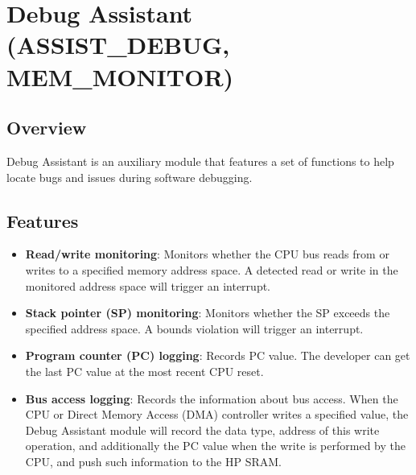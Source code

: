 \documentclass[main\_\_EN.tex]{subfiles}
\begin{document}

\ifglobal
\else
    {\let\clearpage\relax \listoftodos}
    {\let\clearpage\relax \listofdonetodos}
    \tableofcontents
\fi



\chapter{Debug Assistant (ASSIST\_DEBUG, MEM\_MONITOR)}
\label{mod:dbgassist}
\hypertarget{dbgassist}{}

\section{Overview}

Debug Assistant is an auxiliary module that features a set of functions to help locate bugs and issues during software debugging.

\section{Features}
\label{sec:dbgassist-features}

\begin{itemize}
    \item {\bfseries Read/write monitoring}: Monitors whether the CPU bus reads from or writes to a specified memory address space. A detected read or write in the monitored address space will trigger an interrupt.
    \item {\bfseries Stack pointer (SP) monitoring}: Monitors whether the SP exceeds the specified address space. A bounds violation will trigger an interrupt.
    \item {\bfseries Program counter (PC) logging}: Records PC value. The developer can get the last PC value at the most recent CPU reset.
    \item{\bfseries Bus access logging}: Records the information about bus access. When the CPU or Direct Memory Access (DMA) controller writes a specified value, the Debug Assistant module will record the data type, address of this write operation, and additionally the PC value when the write is performed by the CPU, and push such information to the HP SRAM.
\end{itemize}
\end{document}
